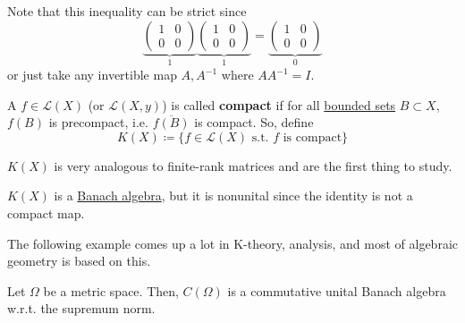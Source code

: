 	Note that this inequality can be strict since 
	\begin{equation}
		\underbrace{\begin{pmatrix} 1 & 0 \\ 0 & 0 \end{pmatrix}}_{1} \underbrace{\begin{pmatrix} 1 & 0 \\ 0 & 0 \end{pmatrix}}_{1} = \underbrace{\begin{pmatrix} 1 & 0 \\ 0 & 0 \end{pmatrix}}_{0}
	\end{equation}
	or just take any invertible map $A, A^{-1}$ where $A A^{-1} = I$. 

	\begin{definition}
	  \label{def:compact-linear-operator}
		A $f \in \mathcal{L}(X)$ (or $\mathcal{L}(X, y)$) is called \textbf{compact} if for all \hyperref[pst-def:bounded-set]{bounded sets} $B \subset X$, $f(B)$ is precompact, i.e. $\overline{f(B)}$ is compact. So, define 
		\begin{equation}
			K(X) \coloneqq \{ f \in \mathcal{L}(X) \text{ s.t. } f \text{ is compact}\}
		\end{equation}
	\end{definition}

	$K(X)$ is very analogous to finite-rank matrices and are the first thing to study. 

	\begin{theorem}
	  \label{thm:compact-linear-endomorphisms-are-banach-algebra}
	  $K(X)$ is a \hyperref[def:banach-algebra]{Banach algebra}, but it is nonunital since the identity is not a compact map. 
	\end{theorem}

	The following example comes up a lot in K-theory, analysis, and most of algebraic geometry is based on this. 

	\begin{example}
	  \label{ex:comega-as-a-commutative-unital-banach-algebra}
	  Let $\Omega$ be a metric space. Then, $C(\Omega)$ is a commutative unital Banach algebra w.r.t. the supremum norm. 
	\end{example}
